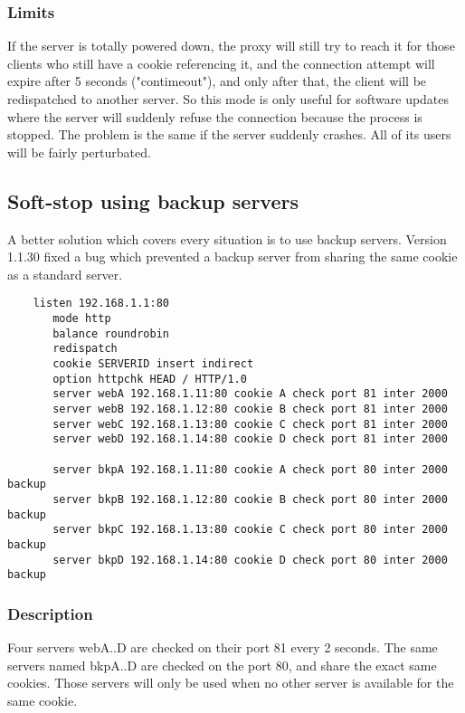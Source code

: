 \subsubsection{Limits}

If the server is totally powered down, the proxy will still try to reach it
for those clients who still have a cookie referencing it, and the connection
attempt will expire after 5 seconds ("contimeout"), and only after that, the
client will be redispatched to another server. So this mode is only useful
for software updates where the server will suddenly refuse the connection
because the process is stopped. The problem is the same if the server suddenly
crashes. All of its users will be fairly perturbated.

\subsection{Soft-stop using backup servers}

A better solution which covers every situation is to use backup servers.
Version 1.1.30 fixed a bug which prevented a backup server from sharing
the same cookie as a standard server.

\begin{verbatim}
    listen 192.168.1.1:80
       mode http
       balance roundrobin
       redispatch
       cookie SERVERID insert indirect
       option httpchk HEAD / HTTP/1.0
       server webA 192.168.1.11:80 cookie A check port 81 inter 2000
       server webB 192.168.1.12:80 cookie B check port 81 inter 2000
       server webC 192.168.1.13:80 cookie C check port 81 inter 2000
       server webD 192.168.1.14:80 cookie D check port 81 inter 2000

       server bkpA 192.168.1.11:80 cookie A check port 80 inter 2000 backup
       server bkpB 192.168.1.12:80 cookie B check port 80 inter 2000 backup
       server bkpC 192.168.1.13:80 cookie C check port 80 inter 2000 backup
       server bkpD 192.168.1.14:80 cookie D check port 80 inter 2000 backup
\end{verbatim}

\subsubsection{Description}

Four servers webA..D are checked on their port 81 every 2 seconds. The same
servers named bkpA..D are checked on the port 80, and share the exact same
cookies. Those servers will only be used when no other server is available
for the same cookie.

